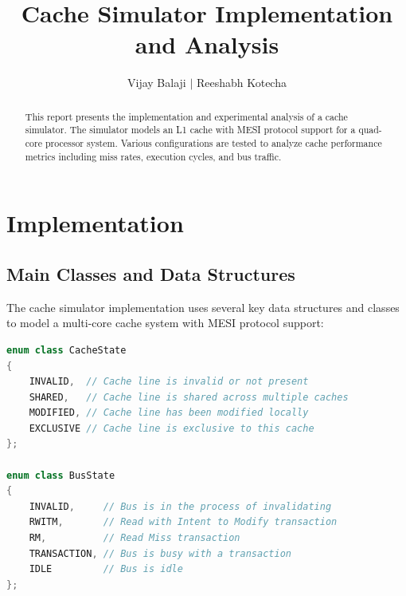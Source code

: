 \documentclass[12pt,a4paper]{article}
\title{Cache Simulator Implementation and Analysis}
\author{Vijay Balaji $|$ Reeshabh Kotecha}
\date{}
\begin{document}
\maketitle
\begin{abstract}
This report presents the implementation and experimental analysis of a cache simulator. The simulator models an L1 cache with MESI protocol support for a quad-core processor system. Various configurations are tested to analyze cache performance metrics including miss rates, execution cycles, and bus traffic.
\end{abstract}

\tableofcontents
\newpage

\section{Implementation}

\subsection{Main Classes and Data Structures}
The cache simulator implementation uses several key data structures and classes to model a multi-core cache system with MESI protocol support:

\begin{lstlisting}[language=C++, caption=Cache State Definitions]
enum class CacheState
{
    INVALID,  // Cache line is invalid or not present
    SHARED,   // Cache line is shared across multiple caches
    MODIFIED, // Cache line has been modified locally
    EXCLUSIVE // Cache line is exclusive to this cache
};

enum class BusState
{
    INVALID,     // Bus is in the process of invalidating
    RWITM,       // Read with Intent to Modify transaction
    RM,          // Read Miss transaction
    TRANSACTION, // Bus is busy with a transaction
    IDLE         // Bus is idle
};
\end{lstlisting}
\end{document}
